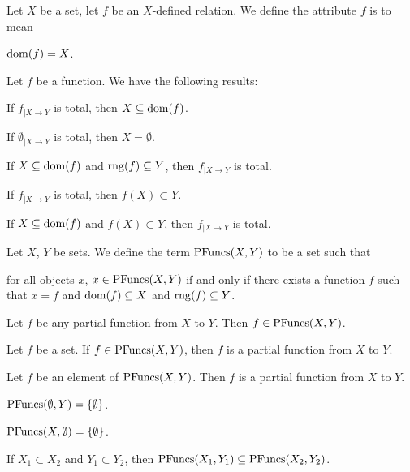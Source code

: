 \documentclass{article}
\begin{document}
\begin{definition}
Let $X$ be a set, let $f$ be an $X$-defined relation.
We define the attribute $f$ is  to mean
\begin{defn}
\item $\operatorname{dom}(f)=X$.
\end{defn}
\end{definition}

Let $f$ be a function. We have the following results:
\begin{thm}
\item\label{partfun1:40} If $f_{|X\to Y}$ is total, then $X\subseteq\operatorname{dom}(f)$.
\item\label{partfun1:41} If $\emptyset_{|X\to Y}$ is total, then $X=\emptyset$.
\item\label{partfun1:42} If $X\subseteq\operatorname{dom}(f)$ and $\operatorname{rng}(f)\subseteq Y$,
  then $f_{|X\to Y}$ is total.
\item\label{partfun1:43} If $f_{|X\to Y}$ is total, then $f(X)\subset Y$.
\item\label{partfun1:44} If $X\subseteq\operatorname{dom}(f)$ and $f(X)\subset Y$,
  then $f_{|X\to Y}$ is total.
\end{thm}

\begin{definition}
Let $X$, $Y$ be sets.
We define the term $\operatorname{PFuncs}(X,Y)$ to be a set such that
\begin{defn}
\item for all objects $x$, $x\in\operatorname{PFuncs}(X,Y)$ if and only if there
  exists a function $f$ such that $x=f$ and $\operatorname{dom}(f)\subseteq X$ and
  $\operatorname{rng}(f)\subseteq Y$.
\end{defn}
\end{definition}

\begin{thm}
\item\label{partfun1:45} Let $f$ be any partial function from $X$ to
  $Y$.
  Then $f\in\operatorname{PFuncs}(X,Y)$.
\item\label{partfun1:46} Let $f$ be a set. If $f\in\operatorname{PFuncs}(X,Y)$,
  then $f$ is a partial function from $X$ to $Y$.
\item\label{partfun1:47} Let $f$ be an element of $\operatorname{PFuncs}(X,Y)$.
  Then $f$ is a partial function from $X$ to $Y$.
\item\label{partfun1:48} $\operatorname{PFuncs}(\emptyset,Y)=\{\emptyset\}$.
\item\label{partfun1:49} $\operatorname{PFuncs}(X,\emptyset)=\{\emptyset\}$.
\item\label{partfun1:50} If $X_{1}\subset X_{2}$ and
  $Y_{1}\subset Y_{2}$, then $\operatorname{PFuncs}(X_{1},Y_{1})\subseteq\operatorname{PFuncs}(X_{2},Y_{2})$.
\end{thm}
\end{document}
